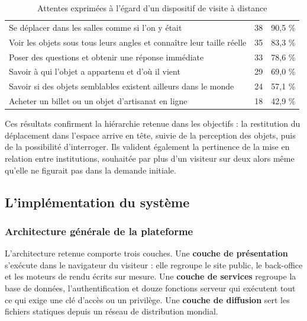 \begin{table}[htbp]
\centering
\caption{Attentes exprimées à l'égard d'un dispositif de visite à distance}
\label{tab:attentes}
\small
\begin{tabularx}{\textwidth}{|X|C{2.4cm}|C{2.4cm}|}
\hline
{}
 &  &  \\ \hline
Se déplacer dans les salles comme si l'on y était & 38 & 90,5 \% \\ \hline
Voir les objets sous tous leurs angles et connaître leur taille réelle & 35 & 83,3 \% \\ \hline
Poser des questions et obtenir une réponse immédiate & 33 & 78,6 \% \\ \hline
Savoir à qui l'objet a appartenu et d'où il vient & 29 & 69,0 \% \\ \hline
Savoir si des objets semblables existent ailleurs dans le monde & 24 & 57,1 \% \\ \hline
Acheter un billet ou un objet d'artisanat en ligne & 18 & 42,9 \% \\ \hline
\end{tabularx}
\end{table}

Ces résultats confirment la hiérarchie retenue dans les objectifs : la
restitution du déplacement dans l'espace arrive en tête, suivie de la perception
des objets, puis de la possibilité d'interroger. Ils valident également la
pertinence de la mise en relation entre institutions, souhaitée par plus d'un
visiteur sur deux alors même qu'elle ne figurait pas dans la demande initiale.

\subsection{L'implémentation du système}
\label{sec:implementation}

\subsubsection{Architecture générale de la plateforme}

L'architecture retenue comporte trois couches. Une \textbf{couche de
présentation} s'exécute dans le navigateur du visiteur : elle regroupe le site
public, le back-office et les moteurs de rendu écrits sur mesure. Une
\textbf{couche de services} regroupe la base de données, l'authentification et
douze fonctions serveur qui exécutent tout ce qui exige une clé d'accès ou un
privilège. Une \textbf{couche de diffusion} sert les fichiers statiques depuis
un réseau de distribution mondial.

